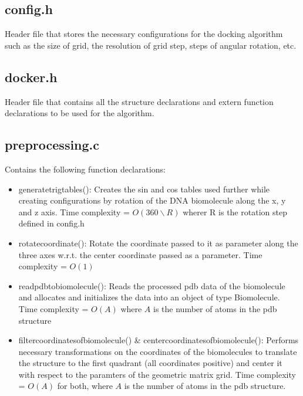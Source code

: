 \documentclass{article}
\begin{document}
\subsection{config.h}
Header file that stores the necessary configurations for the docking algorithm such as the size of grid, the resolution of grid step, steps of angular rotation, etc.
\subsection{docker.h}
Header file that contains all the structure declarations and extern function declarations to be used for the algorithm.
\subsection{preprocessing.c}
Contains the following function declarations:
\begin{itemize}
\item generate\textunderscore trig\textunderscore tables(): Creates the sin and cos tables used further while creating configurations by rotation of the DNA biomolecule along the x, y and z axis. Time complexity = $O(360\backslash R)$ wherer R is the rotation step defined in config.h
\item rotate\textunderscore coordinate(): Rotate the coordinate passed to it as parameter along the three axes w.r.t. the center coordinate passed as a parameter. Time complexity = $O(1)$
\item read\textunderscore pdb\textunderscore to\textunderscore biomolecule(): Reads the processed pdb data of the biomolecule and allocates and initializes the data into an object of type Biomolecule. Time complexity = $O(A)$ where $A$ is the number of atoms in the pdb structure
\item filter\textunderscore coordinates\textunderscore of\textunderscore biomolecule() \& center\textunderscore coordinates\textunderscore of\textunderscore biomolecule(): Performs necessary transformations on the coordinates of the biomolecules to translate the structure to the first quadrant (all coordinates positive) and center it with respect to the paramters of the geometric matrix grid. Time complexity = $O(A)$ for both, where $A$ is the number of atoms in the pdb structure.
\end{itemize}
\end{document}
